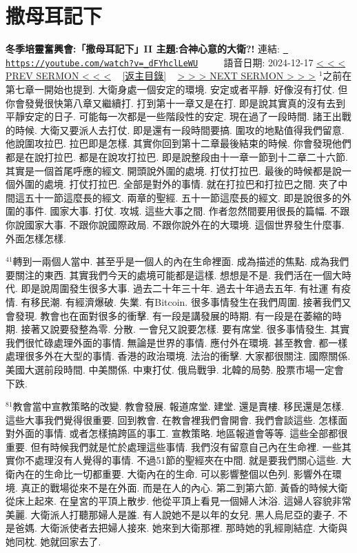 \documentclass{book}
\begin{document}
\section{撒母耳記下}
\label{sec:_dFYhclLeWU}
\textbf{冬季培靈奮興會:「撒母耳記下」II 主題:合神心意的大衛?!}
\newline
\newline
連結: \href{https://youtube.com/watch?v=_dFYhclLeWU}{\texttt{ https://youtube.com/watch?v=\_dFYhclLeWU}} ~~~~ 語音日期: 2024-12-17 
\newline
\newline
\hyperref[sec:KKs6xvdps8w]{\small{< < < PREV SERMON < < <}}
~
\hyperref[sec:index]{\small{[返主目錄]}}
~
\hyperref[sec:m_AdQi66HCM]{\small{> > > NEXT SERMON > > >}}
\newline
\newline
$^{1}$之前在第七章一開始也提到.
大衛身處一個安定的環境.
安定或者平靜.
好像沒有打仗.
但你會發覺很快第八章又繼續打.
打到第十一章又是在打.
即是說其實真的沒有去到平靜安定的日子.
可能每一次都是一些階段性的安定.
現在過了一段時間.
諸王出戰的時候.
大衛又要派人去打仗.
即是還有一段時間要搞.
圍攻的地點值得我們留意.
他說圍攻拉巴.
拉巴即是怎樣.
其實你回到第十二章最後結束的時候.
你會發現他們都是在說打拉巴.
都是在說攻打拉巴.
即是說整段由十一章一節到十二章二十六節.
其實是一個首尾呼應的經文.
開頭說外圍的處境.
打仗打拉巴.
最後的時候都是說一個外圍的處境.
打仗打拉巴.
全部是對外的事情.
就在打拉巴和打拉巴之間.
夾了中間這五十一節這麼長的經文.
兩章的聖經.
五十一節這麼長的經文.
即是說很多的外圍的事件.
國家大事.
打仗.
攻城.
這些大事之間.
作者忽然間要用很長的篇幅.
不跟你說國家大事.
不跟你說國際政局.
不跟你說外在的大環境.
這個世界發生什麼事.
外面怎樣怎樣.

$^{41}$轉到一兩個人當中.
甚至乎是一個人的內在生命裡面.
成為描述的焦點.
成為我們要關注的東西.
其實我們今天的處境可能都是這樣.
想想是不是.
我們活在一個大時代.
即是說周圍發生很多大事.
過去二十年三十年.
過去十年過去五年.
有社運 有疫情.
有移民潮.
有經濟爆破.
失業.
有Bitcoin.
很多事情發生在我們周圍.
接著我們又會發現.
教會也在面對很多的衝擊.
有一段是講發展的時期.
有一段是在萎縮的時期.
接著又說要發整為零.
分散.
一會兒又說要怎樣.
要有席堂.
很多事情發生.
其實我們很忙碌處理外面的事情.
無論是世界的事情.
應付外在環境.
甚至教會.
都一樣處理很多外在大型的事情.
香港的政治環境.
法治的衝擊.
大家都很關注.
國際關係.
美國大選前段時間.
中美關係.
中東打仗.
俄烏戰爭.
北韓的局勢.
股票市場一定會下跌.

$^{81}$教會當中宣教策略的改變.
教會發展.
報道席堂.
建堂.
還是賣樓.
移民還是怎樣.
這些大事我們覺得很重要.
回到教會.
在教會裡我們會開會.
我們會談這些.
怎樣面對外面的事情.
或者怎樣搞跨區的事工.
宣教策略.
地區報道會等等.
這些全部都很重要.
但有時候我們就是忙於處理這些事情.
我們沒有留意自己內在生命裡.
一些其實你不處理沒有人覺得的事情.
不過51節的聖經夾在中間.
就是要我們關心這些.
大衛內在的生命比一切都重要.
大衛內在的生命.
可以影響整個以色列.
影響外在環境.
真正的戰場從來不是在外面.
而是在人的內心.
第二到第六節.
黃昏的時候大衛從床上起來.
在皇宮的平頂上散步.
他從平頂上看見一個婦人沐浴.
這婦人容貌非常美麗.
大衛派人打聽那婦人是誰.
有人說她不是以年的女兒.
黑人烏尼亞的妻子.
不是爸媽.
大衛派使者去把婦人接來.
她來到大衛那裡.
那時她的乳經剛結症.
大衛與她同枕.
她就回家去了.
\end{document}

